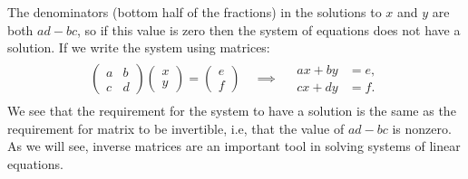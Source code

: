 \documentclass[letterpaper,10pt,english]{jupyterBook}
\begin{document}
\sphinxAtStartPar
The denominators (bottom half of the fractions) in the solutions to \(x\) and \(y\) are both \(a d - b c\), so if this value is zero then the system of equations does not have a solution. If we write the system using matrices:
\begin{equation*}
\begin{split} \begin{align*}
    \begin{pmatrix} a & b \\ c & d \end{pmatrix}
    \begin{pmatrix} x \\ y \end{pmatrix} =
    \begin{pmatrix} e \\ f \end{pmatrix} \quad \implies \quad
    \begin{matrix}
        ax + by \!\!\! &= e, \\
        cx + dy \!\!\! &= f.
    \end{matrix}
\end{align*} \end{split}
\end{equation*}
\sphinxAtStartPar
We see that the requirement for the system to have a solution is the same as the requirement for matrix to be invertible, i.e, that the value of \(ad-bc\) is non\sphinxhyphen{}zero. As we will see, inverse matrices are an important tool in solving systems of linear equations.

\sphinxstepscope

\ignorespaces 
\end{document}
